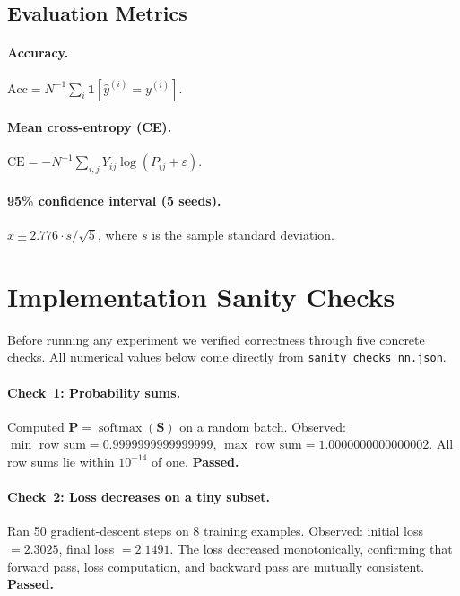 \documentclass[11pt]{article}
\newcommand{\bS}{\mathbf{S}}
\newcommand{\bP}{\mathbf{P}}
\begin{document}
\subsection{Evaluation Metrics}

\paragraph{Accuracy.}
$\mathrm{Acc}=N^{-1}\sum_{i}\mathbf{1}[\hat{y}^{(i)}=y^{(i)}].$

\paragraph{Mean cross-entropy (CE).}
$\mathrm{CE}=-N^{-1}\sum_{i,j}Y_{ij}\log(P_{ij}+\varepsilon).$

\paragraph{95\% confidence interval (5 seeds).}
$\bar{x}\pm2.776\cdot s/\!\sqrt{5}$,
where $s$ is the sample standard deviation.

\section{Implementation Sanity Checks}
\label{sec:sanity}

Before running any experiment we verified correctness through five concrete
checks.
All numerical values below come directly from \texttt{sanity\_checks\_nn.json}.

\paragraph{Check~1: Probability sums.}
Computed $\bP=\operatorname{softmax}(\bS)$ on a random batch.
Observed:
$\min\text{ row sum}=0.9999999999999999$,
$\max\text{ row sum}=1.0000000000000002$.
All row sums lie within $10^{-14}$ of one.
\textbf{Passed.}

\paragraph{Check~2: Loss decreases on a tiny subset.}
Ran 50 gradient-descent steps on 8 training examples.
Observed: initial loss $=2.3025$, final loss $=2.1491$.
The loss decreased monotonically, confirming that forward pass, loss
computation, and backward pass are mutually consistent.
\textbf{Passed.}
\end{document}
